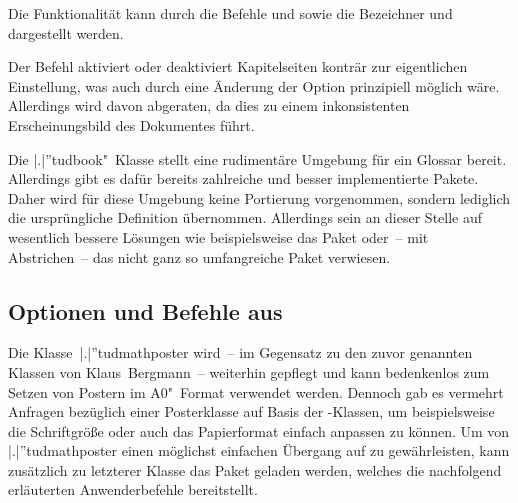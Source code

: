 \begin{DeclareEntity}{}
\begin{NoIndexDefault}
\begin{Declaration}
  {}
\printdeclarationlist
%
Die Funktionalität kann durch die Befehle  und 
 sowie die Bezeichner  und 
 dargestellt werden.
\end{Declaration}

\begin{Declaration}
  {}
\printdeclarationlist
%
Der Befehl aktiviert oder deaktiviert Kapitelseiten konträr zur eigentlichen 
Einstellung, was auch durch eine Änderung der Option  
prinzipiell möglich wäre. Allerdings wird davon abgeraten, da dies zu einem 
inkonsistenten Erscheinungsbild des Dokumentes führt.
\end{Declaration}

\begin{Declaration}
  {}
\begin{Declaration}
  {}
\printdeclarationlist
%
Die \Class|.|''{tudbook}"~Klasse stellt eine rudimentäre Umgebung für ein 
Glossar bereit. Allerdings gibt es dafür bereits zahlreiche und besser 
implementierte Pakete. Daher wird für diese Umgebung keine Portierung 
vorgenommen, sondern lediglich die ursprüngliche Definition übernommen. 
Allerdings sein an dieser Stelle auf wesentlich bessere Lösungen wie 
beispielsweise das Paket  oder~-- mit Abstrichen~-- das 
nicht ganz so umfangreiche Paket  verwiesen.
\end{Declaration}
\end{Declaration}
%



\subsection{%
  Optionen und Befehle aus %
}
%
%
Die Klasse~\Class|.|''{tudmathposter} wird~-- im Gegensatz zu den zuvor 
genannten Klassen von Klaus~Bergmann~-- weiterhin gepflegt und kann bedenkenlos 
zum Setzen von Postern im A0"~Format verwendet werden. Dennoch gab es vermehrt 
Anfragen bezüglich einer Posterklasse auf Basis der \TUDScript-Klassen, um 
beispielsweise die Schriftgröße oder auch das Papierformat einfach anpassen zu 
können. Um von \Class|.|''{tudmathposter} einen möglichst einfachen Übergang 
auf  zu gewährleisten, kann zusätzlich zu letzterer Klasse 
das Paket  geladen werden, welches die nachfolgend 
erläuterten Anwenderbefehle bereitstellt.


\end{NoIndexDefault}
\end{DeclareEntity}
